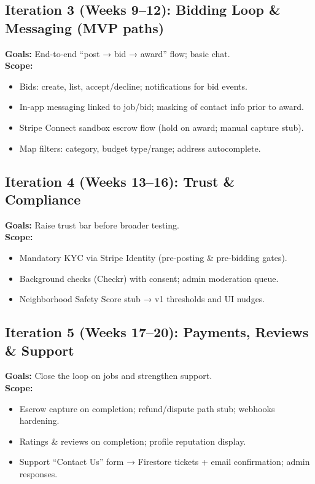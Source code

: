 \documentclass[11pt]{article}
\begin{document}
\subsection*{Iteration 3 (Weeks 9--12): Bidding Loop \& Messaging (MVP paths)}
\textbf{Goals:} End-to-end “post → bid → award” flow; basic chat. \\
\textbf{Scope:}
\begin{itemize}[leftmargin=1.4em]
  \item Bids: create, list, accept/decline; notifications for bid events.
  \item In-app messaging linked to job/bid; masking of contact info prior to award.
  \item Stripe Connect sandbox escrow flow (hold on award; manual capture stub).
  \item Map filters: category, budget type/range; address autocomplete.
\end{itemize}

\subsection*{Iteration 4 (Weeks 13--16): Trust \& Compliance}
\textbf{Goals:} Raise trust bar before broader testing. \\
\textbf{Scope:}
\begin{itemize}[leftmargin=1.4em]
  \item Mandatory KYC via Stripe Identity (pre-posting \& pre-bidding gates).
  \item Background checks (Checkr) with consent; admin moderation queue.
  \item Neighborhood Safety Score stub → v1 thresholds and UI nudges.
\end{itemize}

\subsection*{Iteration 5 (Weeks 17--20): Payments, Reviews \& Support}
\textbf{Goals:} Close the loop on jobs and strengthen support. \\
\textbf{Scope:}
\begin{itemize}[leftmargin=1.4em]
  \item Escrow capture on completion; refund/dispute path stub; webhooks hardening.
  \item Ratings \& reviews on completion; profile reputation display.
  \item Support “Contact Us” form → Firestore tickets + email confirmation; admin responses.
\end{itemize}
\end{document}
